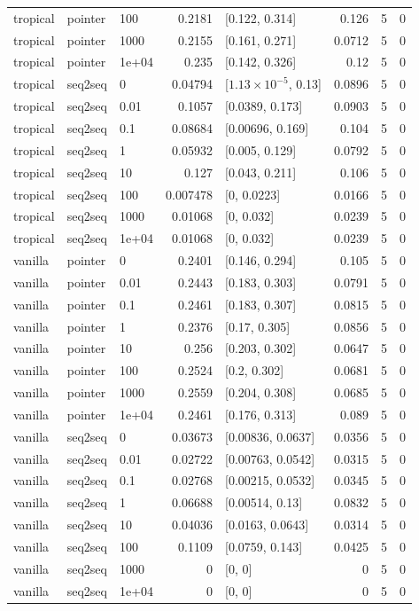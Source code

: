 \documentclass[10pt]{article}
\begin{document}
{\begin{longtable}{lllrlrrr}
tropical & pointer & 100 & 0.2181 & [0.122, 0.314] & 0.126 & 5 & 0\\
tropical & pointer & 1000 & 0.2155 & [0.161, 0.271] & 0.0712 & 5 & 0\\
tropical & pointer & 1e+04 & 0.235 & [0.142, 0.326] & 0.12 & 5 & 0\\
tropical & seq2seq & 0 & 0.04794 & [$1.13\times10^{-5}$, 0.13] & 0.0896 & 5 & 0\\
tropical & seq2seq & 0.01 & 0.1057 & [0.0389, 0.173] & 0.0903 & 5 & 0\\
tropical & seq2seq & 0.1 & 0.08684 & [0.00696, 0.169] & 0.104 & 5 & 0\\
tropical & seq2seq & 1 & 0.05932 & [0.005, 0.129] & 0.0792 & 5 & 0\\
tropical & seq2seq & 10 & 0.127 & [0.043, 0.211] & 0.106 & 5 & 0\\
tropical & seq2seq & 100 & 0.007478 & [0, 0.0223] & 0.0166 & 5 & 0\\
tropical & seq2seq & 1000 & 0.01068 & [0, 0.032] & 0.0239 & 5 & 0\\
tropical & seq2seq & 1e+04 & 0.01068 & [0, 0.032] & 0.0239 & 5 & 0\\
vanilla & pointer & 0 & 0.2401 & [0.146, 0.294] & 0.105 & 5 & 0\\
vanilla & pointer & 0.01 & 0.2443 & [0.183, 0.303] & 0.0791 & 5 & 0\\
vanilla & pointer & 0.1 & 0.2461 & [0.183, 0.307] & 0.0815 & 5 & 0\\
vanilla & pointer & 1 & 0.2376 & [0.17, 0.305] & 0.0856 & 5 & 0\\
vanilla & pointer & 10 & 0.256 & [0.203, 0.302] & 0.0647 & 5 & 0\\
vanilla & pointer & 100 & 0.2524 & [0.2, 0.302] & 0.0681 & 5 & 0\\
vanilla & pointer & 1000 & 0.2559 & [0.204, 0.308] & 0.0685 & 5 & 0\\
vanilla & pointer & 1e+04 & 0.2461 & [0.176, 0.313] & 0.089 & 5 & 0\\
vanilla & seq2seq & 0 & 0.03673 & [0.00836, 0.0637] & 0.0356 & 5 & 0\\
vanilla & seq2seq & 0.01 & 0.02722 & [0.00763, 0.0542] & 0.0315 & 5 & 0\\
vanilla & seq2seq & 0.1 & 0.02768 & [0.00215, 0.0532] & 0.0345 & 5 & 0\\
vanilla & seq2seq & 1 & 0.06688 & [0.00514, 0.13] & 0.0832 & 5 & 0\\
vanilla & seq2seq & 10 & 0.04036 & [0.0163, 0.0643] & 0.0314 & 5 & 0\\
vanilla & seq2seq & 100 & 0.1109 & [0.0759, 0.143] & 0.0425 & 5 & 0\\
vanilla & seq2seq & 1000 & 0 & [0, 0] & 0 & 5 & 0\\
vanilla & seq2seq & 1e+04 & 0 & [0, 0] & 0 & 5 & 0\\
\bottomrule
\end{longtable}
}
\end{document}
